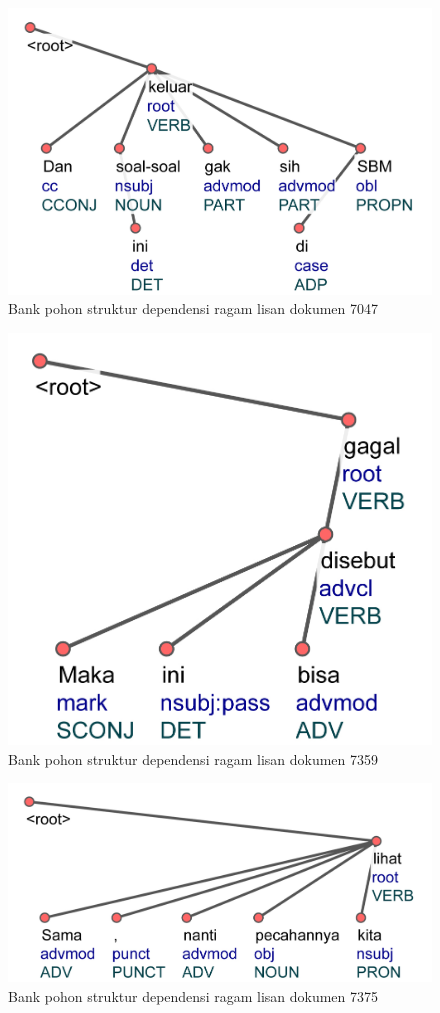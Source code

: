 \begin{figure}
	\centering \includegraphics[width=0.5
	\textwidth] {pics/lampiran/lampiranls7047.jpg} 
	\caption{Bank pohon struktur dependensi ragam lisan dokumen 7047} 
	\label{fig:lampiranls7047} 
\end{figure}


\begin{figure}
	\centering \includegraphics[width=0.35
	\textwidth] {pics/lampiran/lampiranls7359.jpg} 
	\caption{Bank pohon struktur dependensi ragam lisan dokumen 7359} 
	\label{fig:lampiranls7359} 
\end{figure}

\begin{figure}
	\centering \includegraphics[width=0.5
	\textwidth] {pics/lampiran/lampiranls7375.jpg} 
	\caption{Bank pohon struktur dependensi ragam lisan dokumen 7375} 
	\label{fig:lampiranls7375} 
\end{figure}

